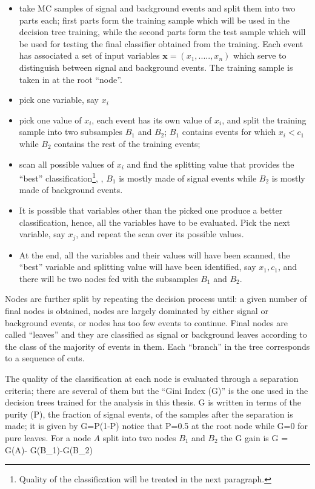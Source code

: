 \begin{itemize}
\item take MC samples of signal and background events and split them into two parts each; first parts form the training sample which will be used in the decision tree training, while the second parts form the test sample which will be used for testing the final classifier obtained from the training. Each event has associated a set of input variables $\textbf{x}=(x_1,.....,x_n)$ which serve to distinguish between signal and background events. The training sample is taken in at the root ``node''. 
\item pick one variable, say $x_i$
\item pick one value of $x_i$, each event has its own value of $x_i$, and split the training sample into two subsamples $B_1$ and $B_2$; $B_1$ contains events for which $x_i< c_1$ while $B_2$ contains the rest of the training events;
\item scan all possible values of $x_i$ and find the splitting value that provides the ``best'' classification\footnote{ Quality of the classification will be treated in the next paragraph.}, \ie, $B_1$ is mostly made of signal events while $B_2$ is mostly made of background events.
\item It is possible that variables other than the picked one produce a better classification, hence, all the variables have to be evaluated. Pick the next variable, say $x_j$, and repeat the scan over its possible values.
\item At the end, all the variables and their values will have been scanned, the ``best'' variable and splitting value will have been identified, say $x_1, c_1$, and there will be two nodes fed with the subsamples $B_1$ and $B_2$. 
\end{itemize}

Nodes are further split by repeating the decision process until: a given number of final nodes is obtained, nodes are largely dominated by either signal or background events, or nodes has too few events to continue. Final nodes are called ``leaves'' and they are classified as signal or background leaves according to the class of the majority of events in them. Each ``branch'' in the tree corresponds to a sequence of cuts. 

The quality of the classification at each node is evaluated through a separation criteria; there are several of them but the ``Gini Index (G)'' is the one used in the decision trees trained for the analysis in this thesis. G is written in terms of the purity (P), \ie the fraction of signal events, of the samples after the separation is made; it is given by
\beqn
G=P(1-P)
\eeqn
\noindent notice that P=0.5 at the root node while G=0 for pure leaves. For a node $A$ split into two nodes $B_1$ and $B_2$ the G gain is
\beqn
\Delta G = G(A)- G(B_1)-G(B_2)
\eeqn

